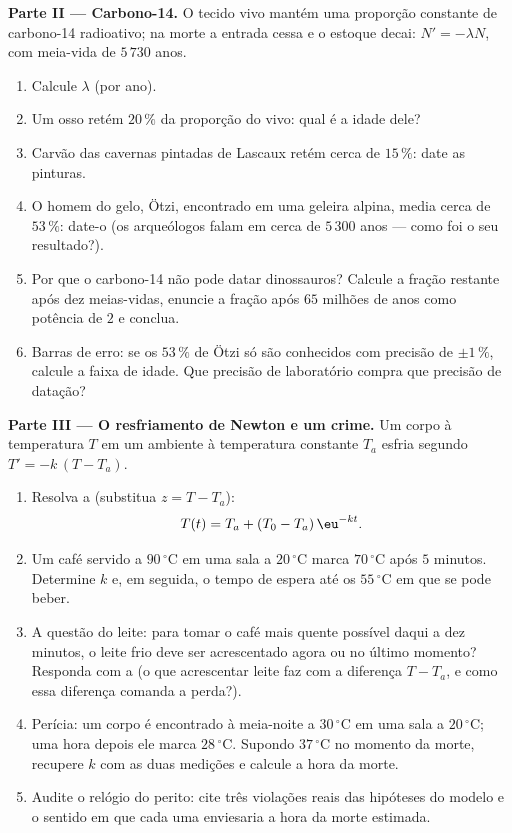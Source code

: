 \begin{problem}
\medskip
\noindent\textbf{Parte II --- Carbono-14.}
O tecido vivo mantém uma proporção constante de carbono-14
radioativo; na morte a entrada cessa e o estoque decai:
$N' = -\lambda N$, com meia-vida de $5\,730$ anos.
\begin{enumerate}[resume]
  \item Calcule $\lambda$ (por ano).
  \item Um osso retém $20\,\%$ da proporção do vivo: qual é a
        idade dele?
  \item Carvão das cavernas pintadas de Lascaux retém cerca de
        $15\,\%$: date as pinturas.
  \item O homem do gelo, Ötzi, encontrado em uma geleira alpina,
        media cerca de $53\,\%$: date-o (os arqueólogos falam em
        cerca de $5\,300$ anos --- como foi o seu resultado?).
  \item Por que o carbono-14 não pode datar dinossauros? Calcule
        a fração restante após dez meias-vidas, enuncie a fração
        após $65$ milhões de anos como potência de $2$ e
        conclua.
  \item Barras de erro: se os $53\,\%$ de Ötzi só são conhecidos
        com precisão de $\pm 1\,\%$, calcule a faixa de idade.
        Que precisão de laboratório compra que precisão de
        datação?
\end{enumerate}

\medskip
\noindent\textbf{Parte III --- O resfriamento de Newton e um
crime.}
Um corpo à temperatura $T$ em um ambiente à temperatura constante
$T_a$ esfria segundo $T' = -k\,(T - T_a)$.
\begin{enumerate}[resume]
  \item Resolva a  (substitua $z = T - T_a$):
        \[
        T(t) = T_a + (T_0 - T_a)\,\eu^{-kt} .
        \]
  \item Um café servido a $90\,^\circ$C em uma sala a
        $20\,^\circ$C marca $70\,^\circ$C após $5$ minutos.
        Determine $k$ e, em seguida, o tempo de espera até os
        $55\,^\circ$C em que se pode beber.
  \item A questão do leite: para tomar o café mais quente
        possível daqui a dez minutos, o leite frio deve ser
        acrescentado agora ou no último momento? Responda com a
         (o que acrescentar leite faz com a diferença
        $T - T_a$, e como essa diferença comanda a perda?).
  \item Perícia: um corpo é encontrado à meia-noite a
        $30\,^\circ$C em uma sala a $20\,^\circ$C; uma hora
        depois ele marca $28\,^\circ$C. Supondo $37\,^\circ$C no
        momento da morte, recupere $k$ com as duas medições e
        calcule a hora da morte.
  \item Audite o relógio do perito: cite três violações reais das
        hipóteses do modelo e o sentido em que cada uma
        enviesaria a hora da morte estimada.
\end{enumerate}


\end{problem}
